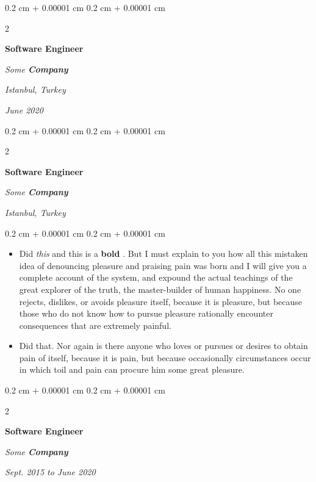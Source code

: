 \documentclass[10pt, letterpaper]{article}
\newenvironment{highlights}{
    \begin{itemize}[
        topsep=0.10 cm,
        parsep=0.10 cm,
        partopsep=0pt,
        itemsep=0pt,
        leftmargin=0.4 cm + 10pt
    ]
}{
    \end{itemize}
} %
\newenvironment{onecolentry}{
    \begin{adjustwidth}{
        0.2 cm + 0.00001 cm
    }{
        0.2 cm + 0.00001 cm
    }
}{
    \end{adjustwidth}
} %
\newenvironment{twocolentry}[2][]{
    \onecolentry
    \def\secondColumn{#2}
    \setcolumnwidth{\fill, 4.5 cm}
    \begin{paracol}{2}
}{
    \switchcolumn \raggedleft \secondColumn
    \end{paracol}
    \endonecolentry
} %
\let\hrefWithoutArrow\href
\renewcommand{\href}[2]{\hrefWithoutArrow{#1}{\mbox{\ifthenelse{\equal{#2}{}}{ }{#2 }\raisebox{.15ex}{\footnotesize \faExternalLink*}}}}
\begin{document}
        \vspace{0.2 cm-3px}

        \begin{twocolentry}{
        \textit{Istanbul, Turkey}    
            
        \textit{June 2020}}
            \textbf{Software Engineer}
            
            \textit{Some \textbf{Company}}
        \end{twocolentry}



        \vspace{0.2 cm-3px}

        \begin{twocolentry}{
        \textit{Istanbul, Turkey}    
            
        }
            \textbf{Software Engineer}
            
            \textit{Some \textbf{Company}}
        \end{twocolentry}

        \vspace{0.10 cm-3px}
        \begin{onecolentry}
            \begin{highlights}
                \item Did \textit{this} and this is a \textbf{bold} \href{https://example.com}{link}. But I must explain to you how all this mistaken idea of denouncing pleasure and praising pain was born and I will give you a complete account of the system, and expound the actual teachings of the great explorer of the truth, the master-builder of human happiness. No one rejects, dislikes, or avoids pleasure itself, because it is pleasure, but because those who do not know how to pursue pleasure rationally encounter consequences that are extremely painful.
                \item Did that. Nor again is there anyone who loves or pursues or desires to obtain pain of itself, because it is pain, but because occasionally circumstances occur in which toil and pain can procure him some great pleasure.
            \end{highlights}
        \end{onecolentry}


        \vspace{0.2 cm-3px}

        \begin{twocolentry}{
            
            
        \textit{Sept. 2015 to June 2020}}
            \textbf{Software Engineer}
            
            \textit{Some \textbf{Company}}
        \end{twocolentry}
\end{document}
